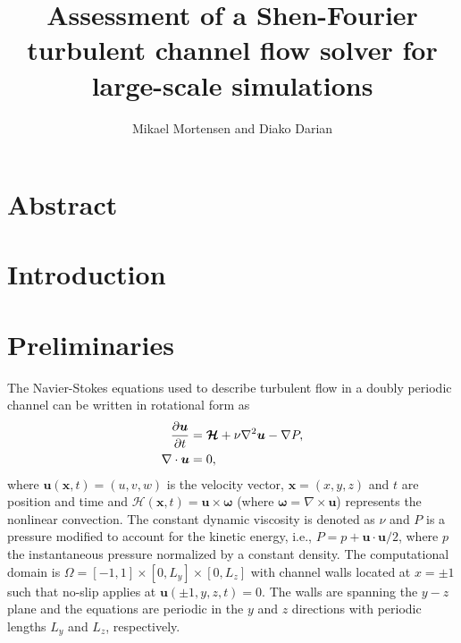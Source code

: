 \documentclass[11pt, oneside]{article}
\title{Assessment of a Shen-Fourier turbulent channel flow solver for large-scale simulations}
\author{Mikael Mortensen and Diako Darian}
\begin{document}
\maketitle
\section*{Abstract}

\section{Introduction}

\section{Preliminaries}
The Navier-Stokes equations used to describe turbulent flow in a doubly 
periodic channel can be written in rotational form as
\begin{align}
 \frac{\partial \bm{u}}{\partial t}   &= \bm{\mathcal{H}} + \nu 
 \nabla^2 \bm{u} - \nabla{P}, \notag \\
 \nabla \cdot \bm{u} &= 0, \label{eq:NS}
\end{align}
where $\bm{u}(\bm{x}, t)=(u, v, w)$ is the velocity vector, $\bm{x}=(x, y, z)$ 
and $t$ are position and time and $\bm{\mathcal{H}}(\bm{x}, t) = \bm{u}\times 
\bm{\omega}$ (where $\bm{\omega} = \nabla \times \bm{u}$)  represents the 
nonlinear convection.  The constant dynamic viscosity is denoted as $\nu$ and 
$P$ is a pressure modified to account for the kinetic energy, i.e., $P = p + 
\bm{u} \cdot \bm{u}/2$, where $p$ the instantaneous pressure 
normalized by a constant density. The computational domain is $\Omega=[-1, 
1]\times [0, L_y] \times [0, L_z]$ with channel walls located at $x=\pm 1$ such 
that no-slip applies at $ \bm{u}(\pm 1, y, z, t) = 0$. The walls are spanning 
the $y-z$ plane and the equations are periodic in the $y$ and $z$ directions 
with periodic lengths $L_y$ and $L_z$, respectively. 
\end{document}
